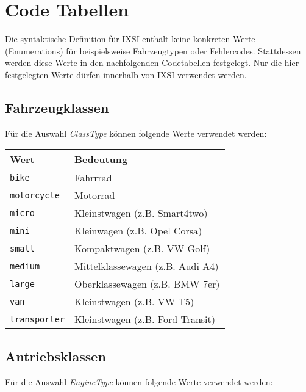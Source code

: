 \chapter{Code Tabellen}
\label{cha:CodeTabellen}
Die syntaktische Definition für IXSI enthält keine konkreten Werte (Enumerations) für beispielsweise Fahrzeugtypen oder Fehlercodes. Stattdessen werden diese Werte in den nachfolgenden Codetabellen festgelegt. Nur die hier festgelegten Werte dürfen innerhalb von IXSI verwendet werden.

\section{Fahrzeugklassen}
\label{sec:CodeTabellen:ClassType}
Für die Auswahl \emph{ClassType} können folgende Werte verwendet werden:

\begin{flushleft}
\begin{tabularx}{\linewidth}{l>{\raggedright\arraybackslash}X} 
\toprule
Wert & Bedeutung\\
\midrule
\verb|bike| & Fahrrrad\\
\verb|motorcycle| & Motorrad\\
\verb|micro| & Kleinstwagen (z.B. Smart4two)\\
\verb|mini| & Kleinwagen (z.B. Opel Corsa)\\
\verb|small| & Kompaktwagen (z.B. VW Golf)\\
\verb|medium| & Mittelklassewagen (z.B. Audi A4)\\
\verb|large| & Oberklassewagen (z.B. BMW 7er)\\
\verb|van| & Kleinstwagen (z.B. VW T5)\\
\verb|transporter| & Kleinstwagen (z.B. Ford Transit)\\
\bottomrule
\end{tabularx}
\end{flushleft}

\section{Antriebsklassen}
\label{sec:CodeTabellen:EngineType}
Für die Auswahl \emph{EngineType} können folgende Werte verwendet werden:

